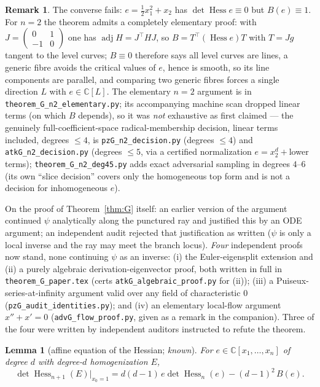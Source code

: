 \documentclass[11pt]{article}
\theoremstyle{plain}
\newtheorem{lemma}[theorem]{Lemma}
\theoremstyle{definition}
\newtheorem{remark}[theorem]{Remark}
\newcommand{\C}{\mathbb{C}}
\newcommand{\Hess}{\operatorname{Hess}}
\newcommand{\adj}{\operatorname{adj}}
\begin{document}
\begin{remark}
The converse fails: $e=\tfrac12x_1^2+x_2$ has $\det\Hess e\equiv0$ but
$B(e)\equiv1$. For $n=2$ the theorem admits a completely elementary proof:
with $J=\left(\begin{smallmatrix}0&1\\-1&0\end{smallmatrix}\right)$ one has
$\adj H=J^\top HJ$, so $B=T^\top(\Hess e)T$ with $T=Jg$ tangent to the
level curves; $B\equiv0$ therefore says all level curves are lines, a
generic fibre avoids the critical values of $e$, hence is smooth, so its
line components are parallel, and comparing two generic fibres forces a
single direction $L$ with $e\in\C[L]$. The elementary $n=2$ argument is in
\texttt{theorem\_G\_n2\_elementary.py}; its accompanying machine scan
dropped linear terms (on which $B$ depends), so it was \emph{not}
exhaustive as first claimed --- the genuinely full-coefficient-space
radical-membership decision, linear terms included, degrees $\le4$, is
\texttt{pzG\_n2\_decision.py} (degrees $\le4$) and
\texttt{atkG\_n2\_decision.py} (degrees $\le5$, via a certified
normalization $e=x_2^d+{}$lower terms); \texttt{theorem\_G\_n2\_deg45.py}
adds exact adversarial sampling in degrees $4$--$6$ (its own ``slice
decision'' covers only the homogeneous top form and is not a decision
for inhomogeneous $e$).

On the proof of Theorem~\ref{thm:G} itself: an earlier version of the
argument continued $\psi$ analytically along the punctured ray and
justified this by an ODE argument; an independent audit rejected that
justification as written ($\psi$ is only a local inverse and the ray may
meet the branch locus). \emph{Four} independent proofs now stand, none
continuing $\psi$ as an inverse: (i) the Euler-eigensplit extension and
(ii) a purely algebraic derivation-eigenvector proof, both written in full
in \texttt{theorem\_G\_paper.tex} (certs
\texttt{atkG\_algebraic\_proof.py} for (ii)); (iii) a
Puiseux-series-at-infinity argument valid over any field of characteristic
$0$ (\texttt{pzG\_audit\_identities.py}); and (iv) an elementary local-flow
argument $x''+x'=0$ (\texttt{advG\_flow\_proof.py}, given as a remark in the
companion). Three of the four were written by independent auditors
instructed to refute the theorem.
\end{remark}

\begin{lemma}[affine equation of the Hessian; \emph{known}]\label{lem:hom}
For $e\in\C[x_1,\dots,x_n]$ of degree $d$ with degree-$d$ homogenization
$E$,
\[
\det\Hess_{n+1}(E)\big|_{x_0=1}
=d(d-1)\,e\det\Hess_n(e)-(d-1)^2\,B(e).
\]
\end{lemma}
\end{document}
